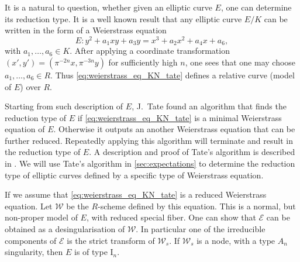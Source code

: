 It is a natural to question, whether given an elliptic curve $E$, one can determine its reduction type. 
It is a well known result that any elliptic curve $E / K$ can be written in the form of a Weierstrass equation \begin{equation}\label{eq:weierstrass_eq_KN_tate}
E: y^2 +a_1 xy + a_3 y= x^3 + a_2 x^2 + a_4 x + a_6
,\end{equation}
with $a_1, \ldots, a_6 \in K$. 
After applying a coordinate transformation $(x', y') = (\pi^{-2n}x, \pi^{-3n} y)$ for sufficiently high $n$, one sees that one may choose  $a_1, \ldots, a_6 \in R$.
Thus \eqref{eq:weierstrass_eq_KN_tate} defines a relative curve (model of $E$) over  $R$. 

Starting from such description of $E$, J.\ Tate found an algorithm that finds the reduction type of $E$ if \eqref{eq:weierstrass_eq_KN_tate} is a minimal Weierstrass equation of  $E$. 
Otherwise it outputs an another Weierstrass equation that can be further reduced. 
Repeatedly applying this algorithm will terminate and result in the reduction type of $E$. 
A description and proof of Tate's algorithm is described in \cite[sec.\ IV.9]{silvermanAdvancedTopicsArithmetic1994}.
We will use Tate's algorithm in \cref{sec:expectations} to determine the reduction type of elliptic curves defined by a specific type of Weierstrass equation.

\medskip

If we assume that \eqref{eq:weierstrass_eq_KN_tate} is a reduced Weierstrass equation. 
Let $\mathscr W $ be the $R$-scheme defined by this equation. 
This is a normal, but non-proper model of $E$, with reduced special fiber. 
One can show that $\mathscr E$ can be obtained as a desingularisation of $\mathscr W$. 
In particular one of the irreducible components of $\mathscr E$ is the strict transform of $\mathscr W_s$. 
If $\mathscr W_s$ is a node, with a type $A_n$ singularity, then $E$ is of type $\mathrm I_n$. 
